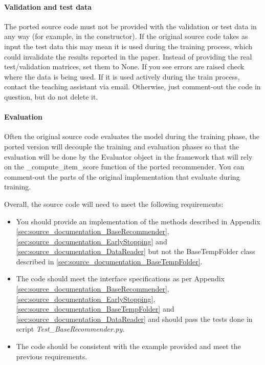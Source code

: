 \documentclass[a4paper]{article}
\begin{document}
\paragraph{Validation and test data} The ported source code must not be provided with the validation or test data in any way (for example, in the constructor). If the original source code takes as input the test data this may mean it is used during the training process, which could invalidate the results reported in the paper. Instead of providing the real test/validation matrices, set them to None. If you see errors are raised check where the data is being used. If it is used actively during the train process, contact the teaching assistant via email. Otherwise, just comment-out the code in question, but do not delete it. 

\paragraph{Evaluation}  Often the original source code evaluates the model during the training phase, the ported version will decouple the training and evaluation phases so that the evaluation will be done by the Evaluator object in the framework that will rely on the \_compute\_item\_score function of the ported recommender. You can comment-out the parts of the original implementation that evaluate during training.

Overall, the source code will need to meet the following requirements:
\label{sec:source_code_requirements}
\begin{itemize} 
    \item You should provide an implementation of the methods described in Appendix \ref{sec:source_documentation_BaseRecommender}, \ref{sec:source_documentation_EarlyStopping} and \ref{sec:source_documentation_DataReader} but not the BaseTempFolder class described in \ref{sec:source_documentation_BaseTempFolder}.
    \item The code should meet the interface specifications as per Appendix \ref{sec:source_documentation_BaseRecommender}, \ref{sec:source_documentation_EarlyStopping}, \ref{sec:source_documentation_BaseTempFolder} and \ref{sec:source_documentation_DataReader} and should pass the tests done in script \emph{Test\_BaseRecommender.py}.
    \item The code should be consistent with the example provided and meet the previous requirements.
\end{itemize}
\end{document}

